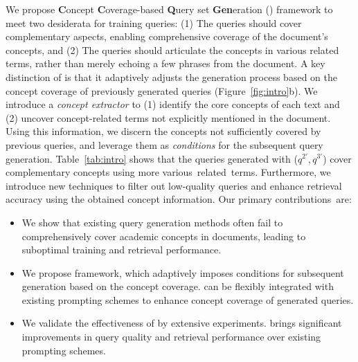 





We propose \textbf{C}oncept \textbf{C}overage-based \textbf{Q}uery set \textbf{Gen}eration (\proposed) framework to meet two desiderata for training queries: 
(1) The queries should cover complementary aspects, enabling comprehensive coverage of the document's concepts, and (2) The queries should articulate the concepts in various related terms, rather than merely echoing a few phrases from the document.
A key distinction of \proposed is that it adaptively adjusts the generation process based on the concept coverage of previously generated queries (Figure~\ref{fig:intro}b).
We introduce a \textit{concept extractor} to (1) identify the core concepts of each text and (2) uncover concept-related terms not explicitly mentioned in the document.
Using this information, we discern the concepts not sufficiently covered by previous queries, and leverage them as \textit{conditions} for the subsequent query generation.
Table~\ref{tab:intro} shows that the queries generated with \proposed ($q^{2'}, q^{3'}$) cover complementary concepts using more various~related~terms. 
Furthermore, we introduce new techniques to filter out low-quality queries and enhance retrieval accuracy using the obtained concept information.
Our primary contributions~are:
\begin{itemize}[leftmargin=*]\vspace{-\topsep}
    \item We show that existing query generation methods often fail to comprehensively cover academic concepts in documents, leading to suboptimal training and retrieval performance.
    
    \item We propose \proposed framework, which adaptively imposes conditions for subsequent generation based on the concept coverage.
    \proposed can be flexibly integrated with existing prompting schemes to enhance concept coverage of generated queries.

    \item We validate the effectiveness of \proposed by extensive experiments. 
    \proposed brings significant improvements in query quality and retrieval performance over existing prompting schemes.
\end{itemize}\vspace{-\topsep}


